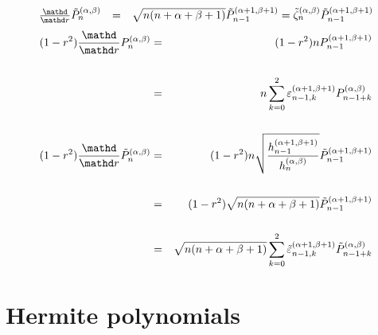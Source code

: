 \begin{equation}
  \label{eq:jac-dpromote} \begin{array}{lll}
    \frac{\mathd}{\mathd r} \tilde{P}_n^{(\alpha, \beta)} & = & \sqrt{n (n +
    \alpha + \beta + 1)} \tilde{P}_{n - 1}^{(\alpha + 1, \beta + 1)} =
    \tilde{\zeta}_n^{(\alpha, \beta)} \tilde{P}_{n - 1}^{(\alpha + 1, \beta +
    1)}
  \end{array}
\end{equation}
\begin{eqnarray}
  (1 - r^2) \frac{\mathd}{\mathd r} P_n^{(\alpha, \beta)} & = & (1 - r^2)
  nP_{n - 1}^{(\alpha + 1, \beta + 1)} \nonumber\\
  &  &  \nonumber\\
  & = & n \sum_{k = 0}^2 \varepsilon_{n - 1, k}^{(\alpha + 1, \beta + 1)}
  P_{n - 1 + k}^{(\alpha, \beta)}  \label{eq:jacform-d}\\
  &  &  \nonumber\\
  (1 - r^2) \frac{\mathd}{\mathd r} \tilde{P}_n^{(\alpha, \beta)} & = & (1 -
  r^2) n \sqrt{\frac{h_{n - 1}^{(\alpha + 1, \beta + 1)}}{h_n^{(\alpha,
  \beta)}}} \tilde{P}_{n - 1}^{(\alpha + 1, \beta + 1)} \nonumber\\
  &  &  \nonumber\\
  & = & (1 - r^2) \sqrt{n (n + \alpha + \beta + 1)}  \tilde{P}^{(\alpha + 1,
  \beta + 1)}_{n - 1} \nonumber\\
  &  &  \nonumber\\
  & = & \sqrt{n (n + \alpha + \beta + 1)} \sum_{k = 0}^2 
  \tilde{\varepsilon}_{n - 1, k}^{(\alpha + 1, \beta + 1)} 
  \tilde{P}^{(\alpha, \beta)}_{n - 1 + k}  \label{eq:jacform-dn}
\end{eqnarray}




\section{Hermite polynomials}

